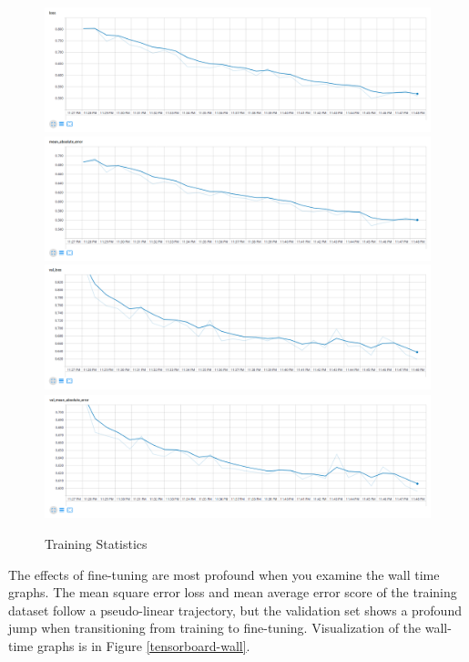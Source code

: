 \documentclass{article}
\begin{document}
\begin{figure}[H]
    \centering
    \includegraphics[width=.9\linewidth]{fine-tune-train-loss.png}
    \includegraphics[width=.9\linewidth]{fine-tune-train-mean-abs-error.png}
    \includegraphics[width=.9\linewidth]{fine-tune-validation-loss.png}
    \includegraphics[width=.9\linewidth]{fine-tune-validation-mean-abs-error.png}
    \caption{Training Statistics}
    \label{tensorboard-fine-tune}
\end{figure}

The effects of fine-tuning are most profound when you examine the wall time graphs.  The mean square error loss and mean average error score of the training dataset follow a pseudo-linear trajectory, but the validation set shows a profound jump when transitioning from training to fine-tuning.  Visualization of the wall-time graphs is in Figure \ref{tensorboard-wall}.
\end{document}
